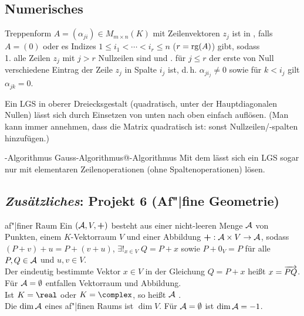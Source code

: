 \subsection{%
    Numerisches%
}

\begin{Def}{Treppenform}
    $A = (\alpha_{ji}) \in M_{m \times n}(K)$ mit Zeilenvektoren $z_j$ ist in
    , falls $A = (0)$ oder es Indizes
    $1 \le i_1 < \cdots < i_r \le n$ ($r = \operatorname{rg}(A)$) gibt, sodass \\
    1. alle Zeilen $z_j$ mit $j > r$ Nullzeilen sind und . für $j \le r$ der erste von Null verschiedene Eintrag der Zeile $z_j$
    in Spalte $i_j$ ist, d.\,h. $\alpha_{ji_{j}} \not= 0$ sowie für $k < i_j$
    gilt $\alpha_{jk} = 0$.
\end{Def}

\begin{Beobachtung}
    Ein LGS in oberer Dreiecksgestalt (quadratisch, unter der Hauptdiagonalen
    Nullen) lässt sich durch Einsetzen von unten nach oben einfach auflösen.
    (Man kann immer annehmen, dass die Matrix quadratisch ist:
    sonst Nullzeilen/-spalten hinzufügen.)
\end{Beobachtung}

\begin{xDef}{-Algorithmus}%
{Gauss-Algorithmus@-Algorithmus}
    Mit dem
    lässt sich ein LGS sogar nur mit elementaren Zeilenoperationen
    (ohne Spaltenoperationen) lösen.
\end{xDef}

\subsection{%
    \emph{Zusätzliches}: Projekt 6 (Af"|fine Geometrie)%
}

\begin{Def}{af"|finer Raum}
    Ein  $(\mathcal{A}, V, \boldsymbol{+})$ besteht aus
    einer nicht-leeren Menge $\mathcal{A}$ von Punkten, einem $K$-Vektorraum $V$
    und einer Abbildung
    $\boldsymbol{+}: \mathcal{A} \times V \rightarrow \mathcal{A}$,
    sodass $(P + v) + u = P + (v + u)$,
    $\exists!_{x \in V}\; Q = P + x$ sowie
    $P + 0_V = P$
    für alle $P, Q \in \mathcal{A}$ und $u, v \in V$. \\
    Der eindeutig bestimmte Vektor $x \in V$ in der Gleichung $Q = P + x$
    heißt $x = \overrightarrow{PQ}$. \\
    Für $\mathcal{A} = \emptyset$ entfallen Vektorraum und Abbildung. \\
    Ist $K = \real$ oder $K = \complex$, so heißt $\mathcal{A}$
    . \\
    Die  $\dim \mathcal{A}$ eines af"|finen Raums ist
    $\dim V$.
    Für $\mathcal{A} = \emptyset$ ist $\dim \mathcal{A} = -1$.
\end{Def}

